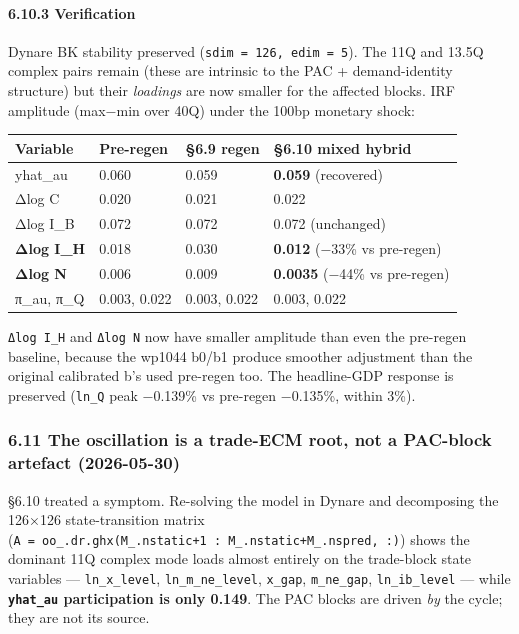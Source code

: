 \documentclass[
]{article}
\newcounter{none} %
\begin{document}
\paragraph{6.10.3 Verification}\label{verification}

Dynare BK stability preserved (\texttt{sdim\ =\ 126,\ edim\ =\ 5}). The
11Q and 13.5Q complex pairs remain (these are intrinsic to the PAC +
demand-identity structure) but their \emph{loadings} are now smaller for
the affected blocks. IRF amplitude (max−min over 40Q) under the 100bp
monetary shock:

{\def\LTcaptype{none} %
\begin{longtable}[]{@{}llll@{}}
\toprule\noalign{}
Variable & Pre-regen & §6.9 regen & §6.10 mixed hybrid \\
\midrule\noalign{}
\endhead
\bottomrule\noalign{}
\endlastfoot
yhat\_au & 0.060 & 0.059 & \textbf{0.059} (recovered) \\
Δlog C & 0.020 & 0.021 & 0.022 \\
Δlog I\_B & 0.072 & 0.072 & 0.072 (unchanged) \\
\textbf{Δlog I\_H} & 0.018 & 0.030 & \textbf{0.012} (−33\% vs
pre-regen) \\
\textbf{Δlog N} & 0.006 & 0.009 & \textbf{0.0035} (−44\% vs
pre-regen) \\
π\_au, π\_Q & 0.003, 0.022 & 0.003, 0.022 & 0.003, 0.022 \\
\end{longtable}
}

\texttt{Δlog\ I\_H} and \texttt{Δlog\ N} now have smaller amplitude than
even the pre-regen baseline, because the wp1044 b0/b1 produce smoother
adjustment than the original calibrated b's used pre-regen too. The
headline-GDP response is preserved (\texttt{ln\_Q} peak −0.139\% vs
pre-regen −0.135\%, within 3\%).

\subsubsection{6.11 The oscillation is a trade-ECM root, not a PAC-block
artefact
(2026-05-30)}\label{the-oscillation-is-a-trade-ecm-root-not-a-pac-block-artefact-2026-05-30}

§6.10 treated a symptom. Re-solving the model in Dynare and decomposing
the 126×126 state-transition matrix
(\texttt{A\ =\ oo\_.dr.ghx(M\_.nstatic+1\ :\ M\_.nstatic+M\_.nspred,\ :)})
shows the dominant 11Q complex mode loads almost entirely on the
trade-block state variables --- \texttt{ln\_x\_level},
\texttt{ln\_m\_ne\_level}, \texttt{x\_gap}, \texttt{m\_ne\_gap},
\texttt{ln\_ib\_level} --- while \textbf{\texttt{yhat\_au} participation
is only 0.149}. The PAC blocks are driven \emph{by} the cycle; they are
not its source.
\end{document}
